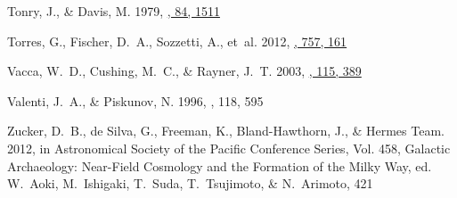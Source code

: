 \documentclass[iop,floatfix,numberedappendix,twocolappendix]{emulateapj}
\begin{document}
\begin{thebibliography}{48}
{Tonry}, J., \& {Davis}, M. 1979,
  \href{http://dx.doi.org/10.1086/112569}{\JournalTitle{\aj}, 84, 1511}

{Torres}, G., {Fischer}, D.~A., {Sozzetti}, A., {et~al.} 2012,
  \href{http://dx.doi.org/10.1088/0004-637X/757/2/161}{\JournalTitle{\apj},
  757, 161}

{Vacca}, W.~D., {Cushing}, M.~C., \& {Rayner}, J.~T. 2003,
  \href{http://dx.doi.org/10.1086/346193}{\JournalTitle{\pasp}, 115, 389}

{Valenti}, J.~A., \& {Piskunov}, N. 1996, \JournalTitle{\aaps}, 118, 595

{Zucker}, D.~B., {de Silva}, G., {Freeman}, K., {Bland-Hawthorn}, J., \&
  {Hermes Team}. 2012, in {Astronomical Society of the Pacific Conference
  Series}, Vol. 458, {Galactic Archaeology: Near-Field Cosmology and the
  Formation of the Milky Way}, ed. W.~{Aoki}, M.~{Ishigaki}, T.~{Suda},
  T.~{Tsujimoto}, \& N.~{Arimoto}, 421

\end{thebibliography}
\end{document}
